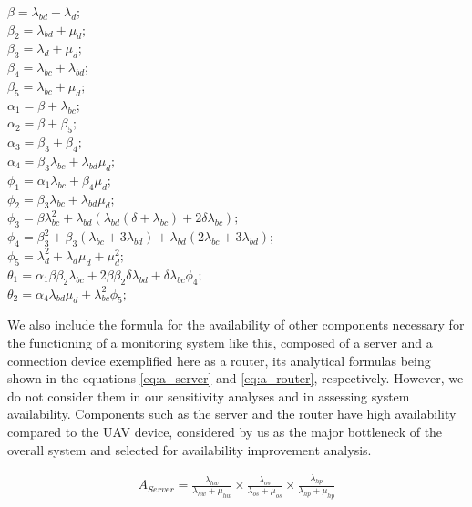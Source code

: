 \documentclass[conference]{IEEEtran}
\begin{document}
\begin{minipage}{.8\textwidth}%
\(\beta = \lambda_{bd} + \lambda_{d};\) \\
\(\beta_{2} = \lambda_{bd} + \mu_{d};\) \\
\(\beta_{3} = \lambda_{d} + \mu_{d};\) \\
\(\beta_{4} = \lambda_{bc} + \lambda_{bd};\) \\
\(\beta_{5} = \lambda_{bc} + \mu_{d};\) \\
\(\alpha_{1} = \beta + \lambda_{bc};\) \\
\(\alpha_{2} = \beta + \beta_{5};\) \\
\(\alpha_{3} = \beta_{3} + \beta_{4};\) \\
\(\alpha_{4} = \beta_{3}\lambda_{bc} + \lambda_{bd} \mu_{d};\) \\
\(\phi_{1} = \alpha_{1}\lambda_{bc} + \beta_{4} \mu_{d};\) \\
\(\phi_{2} = \beta_{3}\lambda_{bc} + \lambda_{bd} \mu_{d};\) \\
\(\phi_{3} = \beta \lambda_{bc}^{2} + \lambda_{bd} (\lambda_{bd} (\delta + \lambda_{bc}) + 2 \delta \lambda_{bc});\) \\
\(\phi_{4} = \beta_{3}^{2} + \beta_{3} (\lambda_{bc} + 3 \lambda_{bd}) + \lambda_{bd} (2 \lambda_{bc} + 3 \lambda_{bd});\) \\
\(\phi_{5} = \lambda_{d}^{2} + \lambda_{d} \mu_{d} + \mu_{d}^{2} ;\) \\
\(\theta_{1} = \alpha_{1} \beta  \beta_{2} \lambda_{bc} + 2 \beta  \beta_{2}  \delta \lambda_{bd}+ \delta  \lambda_{bc} \phi_{4};\) \\
\(\theta_{2} =  \alpha_{4} \lambda_{bd} \mu_{d} + \lambda_{bc}^{2} \phi_{5};\) \\
\end{minipage}%

We also include the formula for the availability of other components necessary for the functioning of a monitoring system like this, composed of a server and a connection device exemplified here as a router, its analytical formulas being shown in the equations \ref{eq:a_server} and \ref{eq:a_router}, respectively. However, we do not consider them in our sensitivity analyses and in assessing system availability. Components such as the server and the router have high availability compared to the UAV device, considered by us as the major bottleneck of the overall system and selected for availability improvement analysis.

\begin{align}\label{eq:a_server}
A_{Server} = \frac{\lambda_{hw}}{\lambda_{hw} + \mu_{hw}} \times \frac{\lambda_{os}}{\lambda_{os} + \mu_{os}} \times
\frac{\lambda_{hp}}{\lambda_{hp} + \mu_{hp}} 
\end{align}
\end{document}
